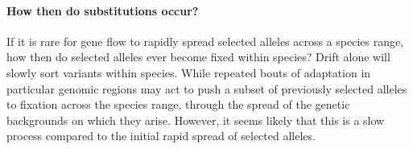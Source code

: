 \documentclass{article}
\newcommand{\plr}[1]{{\it\color{blue}(#1)}}
\begin{document}


\paragraph{How then do substitutions occur?}
If it is rare for gene flow to rapidly spread selected alleles across a species range, 
how then do selected alleles ever become fixed within species? 
Drift alone will slowly sort variants within species. While repeated bouts of adaptation in particular genomic regions may act 
to push a subset of previously selected alleles to fixation across the
species range, through the spread of the genetic backgrounds on which they arise.  
However, it seems likely that this is a slow process compared to the
initial rapid spread of selected alleles.
\end{document}
